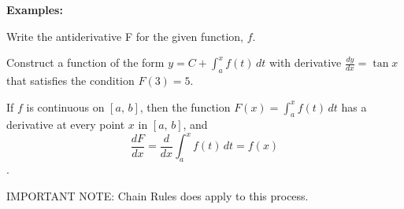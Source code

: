 \documentclass[addpoints, 12pt]{exam}
\begin{document}
\textbf{Examples:}
\begin{questions}
    \question Write the antiderivative F for the given function, $f$.
    
    
    \question Construct a function of the form $y=\displaystyle C+ \int_a^x f(t)\,dt$ with derivative $\displaystyle\frac{dy}{dx}=\tan x$ that satisfies the condition $F(3)=5.$
    
\end{questions}

\newpage

\begin{tcolorbox}[title= DERIVATIVE OF THE INTEGRAL,colframe=black,sharp corners,colback=white,colbacktitle=white,coltitle=black,boxrule=1pt]

     If $f$ is continuous on $[a,\,b]$, then the function $\displaystyle F(x)=\int_a^x f(t)\,dt$ has a derivative at every point $x$ in $[a,\,b]$, and
     \[\frac{dF}{dx}=\frac{d}{dx}\int_a^x f(t)\,dt=f(x)\].
    
\end{tcolorbox}
\begin{center}
    IMPORTANT NOTE: Chain Rules does apply to this process.
\end{center}
\end{document}

